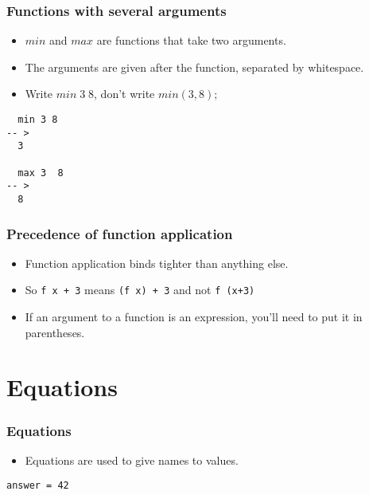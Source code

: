 \documentclass{beamer}
\begin{document}

\begin{frame}[fragile]
\frametitle{Functions with several arguments}

\begin{itemize}
\item $min$ and $max$ are functions that take two arguments.
\item The arguments are given after the function,  separated by
  whitespace. 
\item Write $min\; 3\; 8$, don't write $min(3,8);$
\end{itemize}

\begin{verbatim}
  min 3 8
-- >
  3

  max 3  8
-- >
  8
\end{verbatim}

\end{frame}

\begin{frame}
\frametitle{Precedence of function application}

\begin{itemize}
\item Function application binds tighter than anything else.
\item So \texttt{f x + 3} means \texttt{(f x) + 3} and not \texttt{f (x+3)}
\item If an argument to a function is an expression, you'll need to
  put it in parentheses.
\end{itemize}

\end{frame}

\section{Equations}

\begin{frame}[fragile]
\frametitle{Equations}

\begin{itemize}
\item Equations are used to give names to values.
\end{itemize}

\begin{verbatim}
answer = 42
\end{verbatim}
\end{frame}
\end{document}

